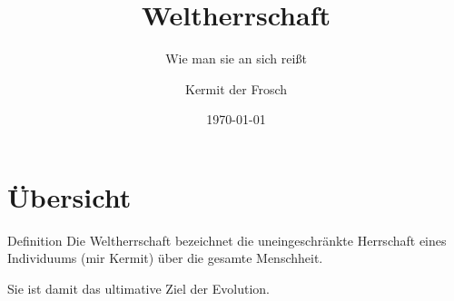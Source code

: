 \documentclass[11pt]{beamer}
\begin{document}
	\author{Kermit der Frosch}
	\title{Weltherrschaft}
	\subtitle{Wie man sie an sich reißt}
	\date{\today}

\begin{frame}	
	\maketitle
\end{frame}

\section{Übersicht}
\begin{frame}{Definition}
	Die Weltherrschaft bezeichnet die uneingeschränkte Herrschaft eines Individuums (mir Kermit) über die gesamte Menschheit.\par\vspace{5mm}
	Sie ist damit das ultimative Ziel der Evolution.
\end{frame}
\end{document}
